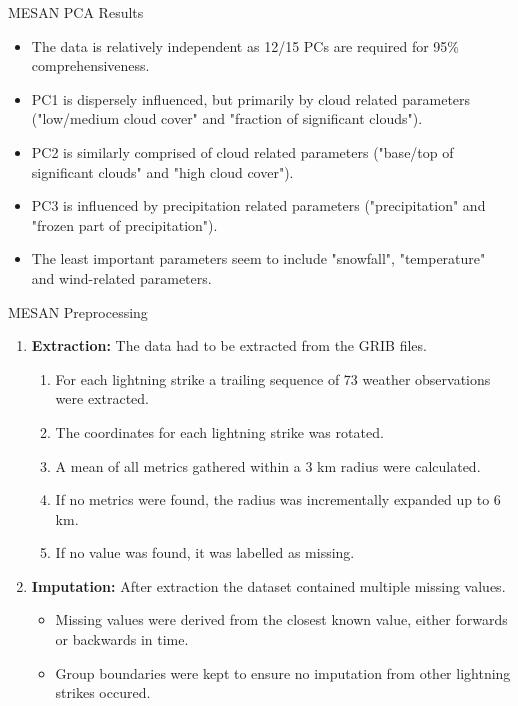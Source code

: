 \documentclass[10pt]{beamer}
\begin{document}
\begin{frame}{MESAN PCA Results}
\begin{itemize}
	\item The data is relatively independent as 12/15 PCs are required for 95\% comprehensiveness.
	\item PC1 is dispersely influenced, but primarily by cloud related parameters ("low/medium cloud cover" and "fraction of significant clouds").
	\item PC2 is similarly comprised of cloud related parameters ("base/top of significant clouds" and "high cloud cover").
	\item PC3 is influenced by precipitation related parameters ("precipitation" and "frozen part of precipitation").
	\item The least important parameters seem to include "snowfall", "temperature" and wind-related parameters.
\end{itemize}
\end{frame}


\begin{frame}{MESAN Preprocessing}
\begin{enumerate}
\item \textbf{Extraction:} The data had to be extracted from the GRIB files.
	\begin{enumerate}
		\item For each lightning strike a trailing sequence of 73 weather observations were extracted.
		\item The coordinates for each lightning strike was rotated.
		\item A mean of all metrics gathered within a 3 km radius were calculated.
		\item If no metrics were found, the radius was incrementally expanded up to 6 km.
		\item If no value was found, it was labelled as missing.
	\end{enumerate}
\item \textbf{Imputation:} After extraction the dataset contained multiple missing values.
	\begin{itemize}
		\item Missing values were derived from the closest known value, either forwards or backwards in time.
		\item Group boundaries were kept to ensure no imputation from other lightning strikes occured.
	\end{itemize}
\end{enumerate}
\end{frame}
\end{document}
